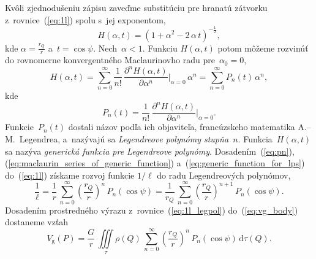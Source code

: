 \documentclass[a4paper,12pt]{book}
\newcommand{\diff}{\mathrm d}
\newcommand{\gidx}{\mathrm g}
\begin{document}
Kvôli zjednodušeniu zápisu zaveďme substitúciu pre hranatú zátvorku
z~rovnice~(\ref{eq:1l}) spolu s~jej exponentom,
%
\begin{equation}
\label{eq:generic_function_for_lps}
H(\alpha, t) = \left(1 + \alpha^2 - 2 \, \alpha\, t \right)^{-\frac{1}{2}}{,}
\end{equation}
%
kde $\alpha = \frac{r_Q}{r}$ a~$t = \cos\psi$.  Nech~$\alpha < 1$.  Funkciu
$H(\alpha, t)$ potom môžeme rozvinúť do rovnomerne konvergentného Maclaurinovho
radu pre~$\alpha_0 = 0$,
%
\begin{equation}
\label{eq:maclaurin_series_of_generic_function}
H(\alpha, t) = \sum_{n = 0}^\infty \frac{1}{n!} \, \frac{\partial^n H(\alpha,
t)}{\partial \alpha^n} \bigg\lvert_{\alpha = 0} \, \alpha^n = \sum_{n 
= 0}^\infty P_n(t) \, \alpha^n{,}
\end{equation}
%
kde
%
\begin{equation}
\label{eq:pn}
P_n(t) = \frac{1}{n!} \, \frac{\partial^n H(\alpha, t)}{\partial \alpha^n} 
\bigg\lvert_{\alpha = 0}{.}
\end{equation}
%
Funkcie~$P_n(t)$ dostali názov podľa ich objaviteľa, francúzskeho matematika
A.--M.~Legendrea, a~nazývajú sa \emph{Legendreove polynómy
stupňa~$n$}.  Funkcia~$H(\alpha, t)$ sa nazýva \emph{generická funkcia pre
Legendreove polynómy}.  Dosadením~(\ref{eq:pn}),
(\ref{eq:maclaurin_series_of_generic_function}) 
a~(\ref{eq:generic_function_for_lps}) do~(\ref{eq:1l}) získame rozvoj funkcie 
$1 \slash \ell$ do radu Legendreových polynómov,
%
\begin{equation}
\label{eq:1l_legpol}
\frac{1}{\ell} = \frac{1}{r} \, \sum_{n = 0}^\infty \left( \frac{r_Q}{r} 
\right)^{n} \, P_n(\cos\psi) = \frac{1}{r_Q} \, \sum_{n = 0}^\infty \left( 
\frac{r_Q}{r} \right)^{n + 1} \, P_n(\cos\psi){.}
\end{equation}
%
Dosadením prostredného výrazu z~rovnice~(\ref{eq:1l_legpol}) 
do~(\ref{eq:vg_body})
dostaneme vzťah
%
\begin{equation}
\label{eq:vg_legpol}
V_\gidx(P) = \frac{G}{r} \, \iiint\limits_{\tau} \rho(Q) \, \sum_{n 
= 0}^{\infty} \left( \frac{r_Q}{r} \right)^n \, P_n(\cos\psi) \, 
\diff\tau(Q){.}
\end{equation}
\end{document}
